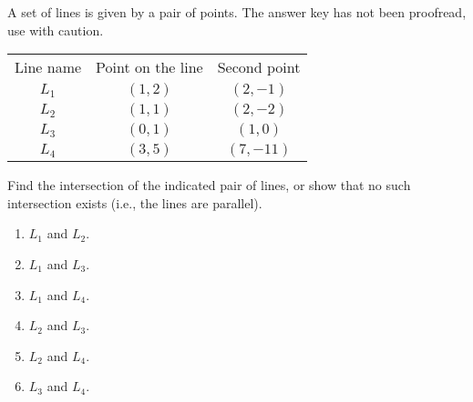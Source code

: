 A set of lines is given by a pair of points. The answer key has not been proofread, use with caution.

\begin{tabular}{ccc}
Line name& Point on the line& Second point \\
$L_1$& $(1,2)$ & $(2,-1)$\\
$L_2$& $(1,1)$ & $(2,-2)$\\
$L_3$& $(0,1)$ & $(1,0)$\\
$L_4$& $(3,5)$ & $(7,-11)$\\
\end{tabular}

Find the intersection of the indicated pair of lines, or show that no such intersection exists (i.e., the lines are parallel).

\begin{enumerate}[ref={\fcProblemRef}]
\item $L_1$ and $L_2$.
\item $L_1$ and $L_3$.
\item $L_1$ and $L_4$.

\item $L_2$ and $L_3$. 
\item $L_2$ and $L_4$.
\item $L_3$ and $L_4$.
\end{enumerate}